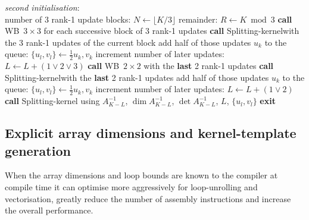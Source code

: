 \documentclass[11pt]{article}
\numberwithin{figure}{section}
\numberwithin{table}{section}
\begin{document}
      \begin{algorithm}[H]
      	\textit{second initialisation}:\\
      	number of 3 rank-1 update blocks: $N \gets \lfloor K/3\rfloor$\;
      	remainder: $R\gets K\bmod{3}$\;
      	 {
      		\textbf{call} WB~$3\times 3$ for each successive block of 3 rank-1 updates\;
      		 {
      			\textbf{call} Splitting-kernel\footnotemark[1] with the 3 rank-1 updates of the current block\;
      			 {
      				add half of those updates $u_k$ to the queue: $\{u_l,v_l\} \gets \frac{1}{2}u_k, v_k$\;
      				increment number of later updates: $L \gets L + (1 \lor 2 \lor 3)$\;
      			}
      		}
      	}
      	 {
      		\textbf{call} WB~$2\times 2$ with the \textbf{last} 2 rank-1 updates\;
      		 {
      			\textbf{call} Splitting-kernel\footnotemark[1] with the \textbf{last} 2 rank-1 updates\;
      			 {
      				add half of those updates $u_k$ to the queue: $\{u_l,v_l\} \gets \frac{1}{2}u_k, v_k$\;
      				increment number of later updates: $L \gets L + (1 \lor 2)$\;
      			}
      		}
      	}
      	{
      		\textbf{call} Splitting-kernel\footnotemark[2] using $A^{-1}_{K-L}$, $\dim A^{-1}_{K-L}$, $\det A^{-1}_{K-L} $, $L$, $\{u_l, v_l\}$\;
      	}
      	\textbf{exit}\;
      \end{algorithm}

    \subsection{Explicit array dimensions and kernel-template generation}
      When the array dimensions and loop bounds are known to the compiler at compile time it can optimise more aggressively for loop-unrolling and vectorisation, greatly reduce the number of assembly instructions and increase the overall performance.\\
   
\end{document}
